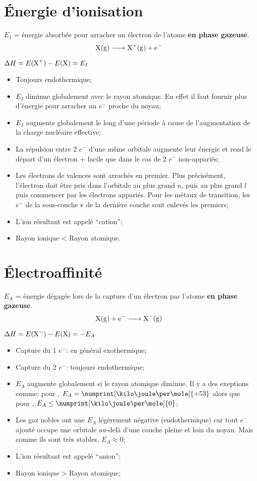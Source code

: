 \section{\'Energie d'ionisation}
\label{sec:ioni}

$E_I$ = énergie absorbée pour arracher un électron de l'atome \textbf{en phase gazeuse}.
$$\ce{X(g) -> X+(g) + e-}$$

$\Delta H = E(\ce{X^+})-E(\ce{X}) = E_I$

\begin{itemize}
	\item Toujours endothermique;
	\item $E_I$ diminue globalement avec le rayon atomique.
		En effet il faut fournir plus d'énergie pour arracher un $e^-$ proche du noyau;
	\item $E_I$ augmente globalement le long d'une période à cause de l'augmentation de la charge nucléaire effective;
	\item La répulsion entre 2 $e^-$ d'une même orbitale augmente leur énergie et rend le départ d'un électron + facile que dans le cas de 2 $e^-$ non-appariés;
	\item Les électrons de valences sont arrachés en premier.
		Plus précisément, l'électron doit être pris dans l'orbitale au plus grand $n$, puis au plus grand $l$ puis commencer par les électrons appariés.
		Pour les métaux de transition, les $e^-$ de la sous-couche $\mathrm{s}$ de la dernière couche sont enlevés les premiers;
	\item L'ion résultant est appelé ``cation'';
	\item Rayon ionique < Rayon atomique.
\end{itemize}

\section{\'Electroaffinité}
\label{sec:electro}

$E_A$ = énergie dégagée lors de la capture d'un électron par l'atome \textbf{en phase gazeuse}.
\[ \ce{X(g) + e- -> X^-(g)} \]

$\Delta H = E(\ce{X^-})-E(\ce{X})=-E_A$

\begin{itemize}
	\item Capture du 1 $e^-$: en général exothermique;
	\item Capture du 2 $e^-$: toujours endothermique;
	\item $E_A$ augmente globalement si le rayon atomique diminue.
		Il y a des exeptions comme:
		pour , $E_A = \numprint[\kilo\joule\per\mole]{+53}$ alors que pour , $E_A \leq \numprint[\kilo\joule\per\mole]{0}$;
	\item Les gaz nobles ont une $E_A$ légèrement négative (endothermique) car tout $e^-$ ajouté occupe une orbitale au-delà d'une couche pleine et loin du noyau.
		Mais comme ils sont très stables, $E_A \approx 0$;
	\item L'ion résultant est appelé ``anion'';
	\item Rayon ionique > Rayon atomique;
\end{itemize}

